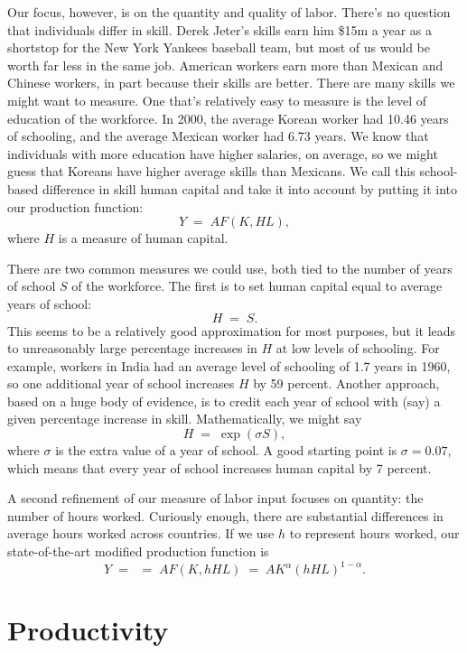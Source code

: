 Our focus, however, is on the quantity and quality of labor.
There's no question that individuals differ in skill.
Derek Jeter's skills earn him
\$15m a year as a shortstop for the New York Yankees baseball team,
but most of us would be worth far less in the same job.
American workers earn more than Mexican and Chinese workers,
in part because their skills are better.
There are many skills we might want to measure.
One that's relatively easy to measure is the level of education of the
workforce.
In 2000, the average Korean worker had 10.46 years of
schooling, and the average Mexican worker had 6.73 years. We know
that individuals with more education have higher salaries, on
average, so we might guess that Koreans have higher average skills
than Mexicans. We call this school-based difference in skill
human capital and take it into account by putting
it into our production function:
\[
    Y \;=\; A F(K,HL),
\]
where $H$ is a measure of human capital.


There are two common measures we could use,
both tied to the number of years of school $S$ of the workforce.
The first is to set human capital equal to average years of school:
\[
    H \;=\; S .
\]
This seems to be a relatively good approximation for most purposes,
but it leads to unreasonably large percentage increases in $H$
at low levels of schooling.
For example, workers in India had an average level of schooling
of 1.7 years in 1960,
so one additional year of school increases $H$ by 59 percent.
Another approach, based on a huge body of evidence,
is to credit each year of school with (say) a given percentage
increase in skill.
Mathematically, we might say
\[
    H \;=\; \exp( \sigma S ) ,
\]
where $\sigma$ is the extra value of a year of school.
A good starting point is $\sigma = 0.07$,
which means that every year of school increases
human capital by 7 percent.


A second refinement of our measure of labor input focuses on quantity:
the number of hours worked.
Curiously enough, there are substantial differences
in average hours worked across countries.
If we use $h$ to represent hours worked, our state-of-the-art
modified production function is
\begin{equation}
    Y \;=\; \;=\; A F(K,hHL)
      \;=\;  A K^{\alpha} (hHL)^{1-\alpha}.
      \label{eq:pf-mod}
\end{equation}



\section{Productivity}

